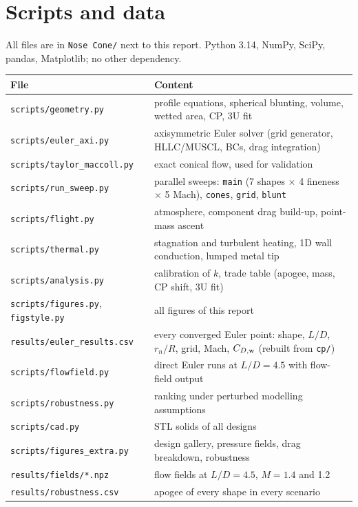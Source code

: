 \section{Scripts and data}
\label{app:scripts}

All files are in \texttt{Nose Cone/} next to this report. Python 3.14, NumPy, SciPy, pandas,
Matplotlib; no other dependency.

\begin{table}[H]
\centering
\small
\begin{tabular}{@{}lp{10.2cm}@{}}
\toprule
File & Content \\
\midrule
\texttt{scripts/geometry.py} & profile equations, spherical blunting, volume, wetted area, CP, 3U fit \\
\texttt{scripts/euler\_axi.py} & axisymmetric Euler solver (grid generator, HLLC/MUSCL, BCs, drag integration) \\
\texttt{scripts/taylor\_maccoll.py} & exact conical flow, used for validation \\
\texttt{scripts/run\_sweep.py} & parallel sweeps: \texttt{main} (7 shapes $\times$ 4 fineness $\times$ 5 Mach), \texttt{cones}, \texttt{grid}, \texttt{blunt} \\
\texttt{scripts/flight.py} & atmosphere, component drag build-up, point-mass ascent \\
\texttt{scripts/thermal.py} & stagnation and turbulent heating, 1D wall conduction, lumped metal tip \\
\texttt{scripts/analysis.py} & calibration of $k$, trade table (apogee, mass, CP shift, 3U fit) \\
\texttt{scripts/figures.py}, \texttt{figstyle.py} & all figures of this report \\
\texttt{results/euler\_results.csv} & every converged Euler point: shape, $L/D$, $r_n/R$, grid, Mach, $C_{D,\rm w}$ (rebuilt from \texttt{cp/}) \\
\texttt{scripts/flowfield.py} & direct Euler runs at $L/D=4.5$ with flow-field output \\
\texttt{scripts/robustness.py} & ranking under perturbed modelling assumptions \\
\texttt{scripts/cad.py} & STL solids of all designs \\
\texttt{scripts/figures\_extra.py} & design gallery, pressure fields, drag breakdown, robustness \\
\texttt{results/fields/*.npz} & flow fields at $L/D=4.5$, $M=1.4$ and 1.2 \\
\texttt{results/robustness.csv} & apogee of every shape in every scenario \\

\end{tabular}
\end{table}
